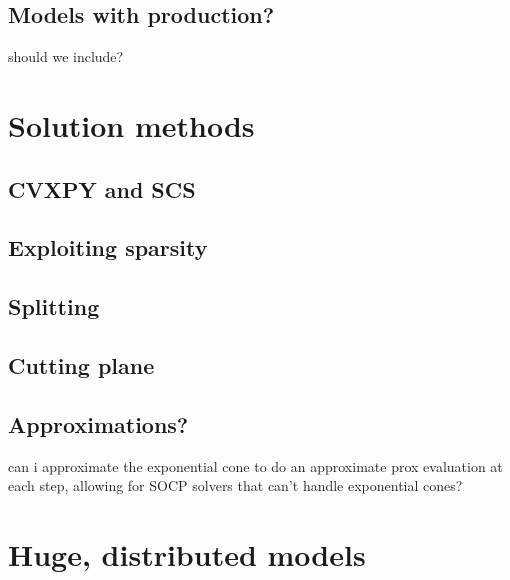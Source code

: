 \documentclass{article}
\begin{document}
\subsection{Models with production?}
should we include?

\section{Solution methods}

\subsection{CVXPY and SCS}
\subsection{Exploiting sparsity}
\subsection{Splitting}
\subsection{Cutting plane}
\subsection{Approximations?}
can i approximate the exponential cone to do an approximate prox evaluation
at each step, allowing for SOCP solvers that can't handle exponential cones?

\section{Huge, distributed models}
\end{document}
